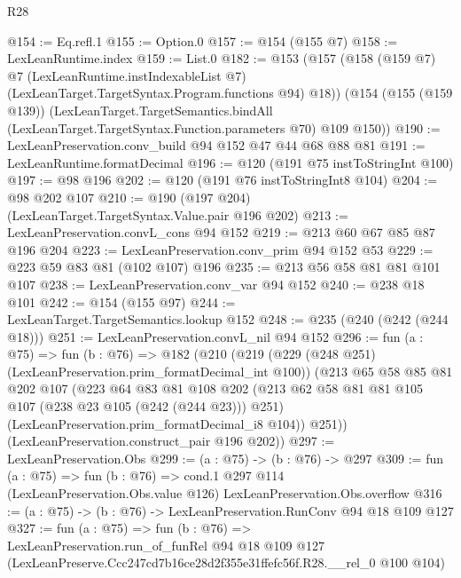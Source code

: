 \begin{lexlean}{R28}
\begin{coremodule}
@154 := Eq.refl.{1}
@155 := Option.{0}
@157 := @154 (@155 @7)
@158 := LexLeanRuntime.index
@159 := List.{0}
@182 := @153
    (@157
      (@158
        (@159 @7)
        @7
        (LexLeanRuntime.instIndexableList @7)
        (LexLeanTarget.TargetSyntax.Program.functions @94)
        @18))
    (@154
      (@155 (@159 @139))
      (LexLeanTarget.TargetSemantics.bindAll
        (LexLeanTarget.TargetSyntax.Function.parameters @70)
        @109
        @150))
@190 := LexLeanPreservation.conv_build @94 @152 @47 @44 @68 @88 @81
@191 := LexLeanRuntime.formatDecimal
@196 := @120 (@191 @75 instToStringInt @100)
@197 := @98 @196
@202 := @120 (@191 @76 instToStringInt8 @104)
@204 := @98 @202 @107
@210 := @190 (@197 @204) (LexLeanTarget.TargetSyntax.Value.pair @196 @202)
@213 := LexLeanPreservation.convL_cons @94 @152
@219 := @213 @60 @67 @85 @87 @196 @204
@223 := LexLeanPreservation.conv_prim @94 @152 @53
@229 := @223 @59 @83 @81 (@102 @107) @196
@235 := @213 @56 @58 @81 @81 @101 @107
@238 := LexLeanPreservation.conv_var @94 @152
@240 := @238 @18 @101
@242 := @154 (@155 @97)
@244 := LexLeanTarget.TargetSemantics.lookup @152
@248 := @235 (@240 (@242 (@244 @18)))
@251 := LexLeanPreservation.convL_nil @94 @152
@296 := fun (a : @75) =>
  fun (b : @76) =>
  @182
    (@210
      (@219
        (@229 (@248 @251) (LexLeanPreservation.prim_formatDecimal_int @100))
        (@213
          @65
          @58
          @85
          @81
          @202
          @107
          (@223
            @64
            @83
            @81
            @108
            @202
            (@213 @62 @58 @81 @81 @105 @107 (@238 @23 @105 (@242 (@244 @23))) @251)
            (LexLeanPreservation.prim_formatDecimal_i8 @104))
          @251))
      (LexLeanPreservation.construct_pair @196 @202))
@297 := LexLeanPreservation.Obs
@299 := (a : @75) -> (b : @76) -> @297
@309 := fun (a : @75) =>
  fun (b : @76) =>
  cond.{1} @297 @114 (LexLeanPreservation.Obs.value @126) LexLeanPreservation.Obs.overflow
@316 := (a : @75) -> (b : @76) -> LexLeanPreservation.RunConv @94 @18 @109 @127
@327 := fun (a : @75) =>
  fun (b : @76) =>
  LexLeanPreservation.run_of_funRel
    @94
    @18
    @109
    @127
    (LexLeanPreserve.Ccc247cd7b16ce28d2f355e31ffefc56f.R28.__rel_0 @100 @104)
\end{coremodule}
\end{lexlean}
